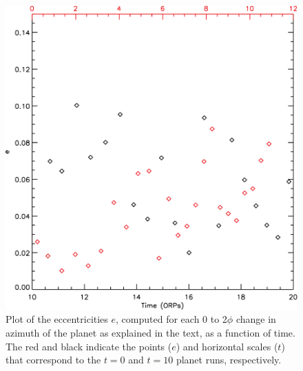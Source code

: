 \documentclass[12pt,manuscript,authoryear]{aastex}
\begin{document}
\begin{figure}[t]
\center
\includegraphics[width=12cm]{../Figures/planete.pdf}
\caption{Plot of the eccentricities $e$, computed for each 0 to 2$\phi$ change in azimuth of the planet as explained in the text, as a function of time. The red and black indicate the points ($e$) and horizontal scales ($t$) that correspond to the $t = 0$ and $t = 10$ planet runs, respectively.}
\label{fig:e}
\end{figure}


\label{lastpage}
\end{document}
